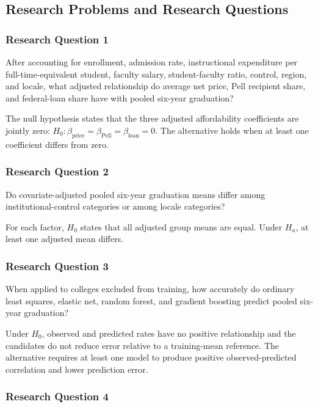 \documentclass[12pt,a4paper]{article}
\begin{document}
\subsection{Research Problems and Research Questions}

\subsubsection{Research Question 1}

After accounting for enrollment, admission rate, instructional expenditure per full-time-equivalent student, faculty salary, student-faculty ratio, control, region, and locale, what adjusted relationship do average net price, Pell recipient share, and federal-loan share have with pooled six-year graduation?

The null hypothesis states that the three adjusted affordability coefficients are jointly zero: $H_0:\beta_{\text{price}}=\beta_{\text{Pell}}=\beta_{\text{loan}}=0$. The alternative holds when at least one coefficient differs from zero.

\subsubsection{Research Question 2}

Do covariate-adjusted pooled six-year graduation means differ among institutional-control categories or among locale categories?

For each factor, $H_0$ states that all adjusted group means are equal. Under $H_a$, at least one adjusted mean differs.

\subsubsection{Research Question 3}

When applied to colleges excluded from training, how accurately do ordinary least squares, elastic net, random forest, and gradient boosting predict pooled six-year graduation?

Under $H_0$, observed and predicted rates have no positive relationship and the candidates do not reduce error relative to a training-mean reference. The alternative requires at least one model to produce positive observed-predicted correlation and lower prediction error.

\subsubsection{Research Question 4}
\end{document}
